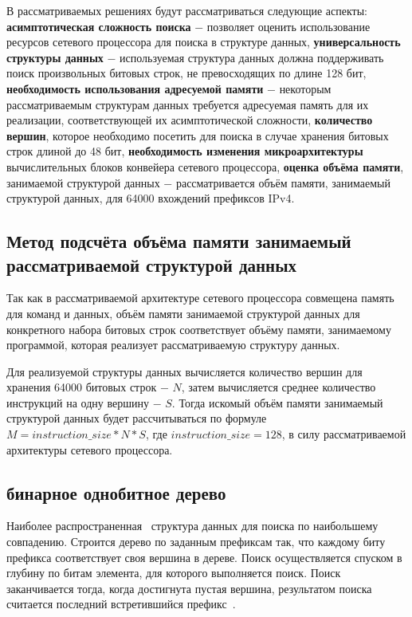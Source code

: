 \documentclass[conference]{IEEEtran}
\begin{document}
        В рассматриваемых решениях будут рассматриваться следующие аспекты:
        {\bf асимптотическая сложность поиска} $-$ позволяет оценить использование 
        ресурсов сетевого процессора для поиска в структуре данных,
        {\bf универсальность структуры данных} $-$ используемая структура данных
        должна поддерживать поиск произвольных битовых строк, не превосходящих по длине 128 бит,
        {\bf необходимость использования адресуемой памяти} $-$ некоторым рассматриваемым 
        структурам данных требуется адресуемая память для их реализации, 
        соответствующей их асимптотической сложности,
        {\bf количество вершин}, которое необходимо посетить для поиска
        в случае хранения битовых строк длиной до 48 бит,
        {\bf необходимость изменения микроархитектуры} вычислительных блоков конвейера 
        сетевого процессора,
        {\bf оценка объёма памяти}, занимаемой структурой данных $-$ рассматривается объём памяти, занимаемый структурой данных, для 64000 вхождений префиксов IPv4.

    \subsection{Метод подсчёта объёма памяти занимаемый рассматриваемой структурой данных}
        Так как в рассматриваемой архитектуре сетевого процессора совмещена память для команд и данных, объём памяти занимаемой структурой данных 
        для конкретного набора битовых строк соответствует объёму памяти, занимаемому программой, которая реализует рассматриваемую структуру данных.

        Для реализуемой структуры данных вычисляется количество вершин для хранения 64000 битовых строк $-$ $N$, затем вычисляется среднее количество инструкций на 
        одну вершину $-$ $S$. Тогда искомый объём памяти занимаемый структурой данных будет рассчитываться по формуле $M = instruction\_size * N * S$,
        где $instruction\_size = 128$, в силу рассматриваемой архитектуры сетевого процессора.
        \subsection{бинарное однобитное дерево}
            Наиболее распространенная~\cite{behdadfar2009scalar} структура данных для поиска по наибольшему совпадению. 
            Строится дерево по заданным префиксам так, что каждому биту префикса соответствует своя вершина в дереве. 
            Поиск осуществляется спуском в глубину по битам элемента, для которого выполняется поиск. 
            Поиск заканчивается тогда, когда достигнута пустая вершина, результатом поиска считается последний встретившийся префикс~\cite{chao2007high:1}.
\end{document}
